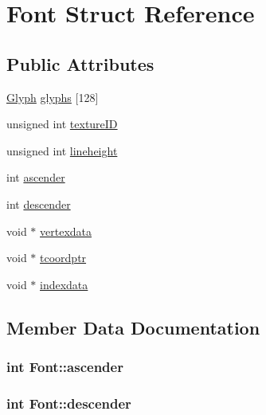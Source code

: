 \hypertarget{struct_font}{
\section{Font Struct Reference}
\label{struct_font}
}
\subsection*{Public Attributes}
\begin{CompactItemize}
\item 
\hyperlink{struct_glyph}{Glyph} \hyperlink{struct_font_6abfbebb57f4453f2741be71c9713cfb}{glyphs} \mbox{[}128\mbox{]}
\item 
unsigned int \hyperlink{struct_font_a7f41941910448dfbc0d53d2f8298788}{textureID}
\item 
unsigned int \hyperlink{struct_font_1396046bb4860d92c8af99c842067ad8}{lineheight}
\item 
int \hyperlink{struct_font_cdf11d9097af3335a197a15ce8b0ffa6}{ascender}
\item 
int \hyperlink{struct_font_6c97c5b390a2fa29077c343faa68a065}{descender}
\item 
void $\ast$ \hyperlink{struct_font_bf8e8b2ba6bd8cd366815378298eb72c}{vertexdata}
\item 
void $\ast$ \hyperlink{struct_font_ade2862a98a99616113c3da2be293869}{tcoordptr}
\item 
void $\ast$ \hyperlink{struct_font_bc7838a3f39e83417a0d53192a75e0e1}{indexdata}
\end{CompactItemize}


\subsection{Member Data Documentation}
\hypertarget{struct_font_cdf11d9097af3335a197a15ce8b0ffa6}{
\subsubsection[{ascender}]{\setlength{\rightskip}{0pt plus 5cm}int {\bf Font::ascender}}}
\label{struct_font_cdf11d9097af3335a197a15ce8b0ffa6}


\hypertarget{struct_font_6c97c5b390a2fa29077c343faa68a065}{
\subsubsection[{descender}]{\setlength{\rightskip}{0pt plus 5cm}int {\bf Font::descender}}}
\label{struct_font_6c97c5b390a2fa29077c343faa68a065}


